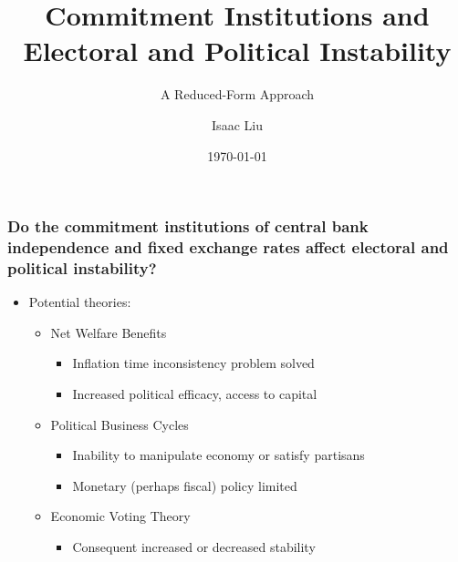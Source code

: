 \documentclass{beamer}
\title[Commitment Institutions and Instability]{Commitment Institutions and Electoral and Political Instability}
\subtitle{A Reduced-Form Approach}
\author{Isaac Liu}
\date{\today}
\begin{document}
    \begin{frame}
        \titlepage
    \end{frame}

    \begin{frame}
        \frametitle{\small Do the commitment institutions of central bank independence and fixed exchange rates affect electoral and political instability?}
        \begin{itemize}
            \item Potential theories:
            \begin{itemize}
                \item Net Welfare Benefits
                \begin{itemize}
                    \item Inflation time inconsistency problem solved
                    \item Increased political efficacy, access to capital
                \end{itemize}
                \item Political Business Cycles
                \begin{itemize}
                    \item Inability to manipulate economy or satisfy partisans
                    \item Monetary (perhaps fiscal) policy limited
                \end{itemize}
                \item Economic Voting Theory
                \begin{itemize}
                    \item Consequent increased or decreased stability
                \end{itemize}
            \end{itemize}
        \end{itemize}

        \begin{figure}[h]
    

\end{figure}
\end{frame}
\end{document}
